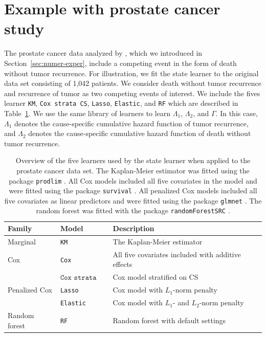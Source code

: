 \documentclass{statsoc}
\numberwithin{theorem}{section}
\newcommand{\1}{\mathds{1}}
\begin{document}
\section{Example with prostate cancer study}
\label{sec:real-data-appl}

The prostate cancer data analyzed by \cite{kattan2000pretreatment}, which we
introduced in Section~\ref{sec:numer-exper}, include a competing event in the
form of death without tumor recurrence. For illustration, we fit the state
learner to the original data set consisting of 1,042 patients. We consider death
without tumor recurrence and recurrence of tumor as two competing events of
interest. We include the fives learner \texttt{KM}, \texttt{Cox strata CS},
\texttt{Lasso}, \texttt{Elastic}, and \texttt{RF} which are described in
Table~\ref{tab:zel-library}. We use the same library of learners to learn
\( \Lambda_1 \), \( \Lambda_2 \), and $\Gamma$. In this case, \( \Lambda_1 \)
denotes the cause-specific cumulative hazard function of tumor recurrence, and
\( \Lambda_2 \) denotes the cause-specific cumulative hazard function of death
without tumor recurrence.

\begin{table}
  \caption{\label{tab:zel-library}Overview of the five learners used by the
  state learner when applied to the prostate cancer data set. The Kaplan-Meier
  estimator was fitted using the package \texttt{prodlim}
  \citep{Gerds_2019prodlim}. All Cox models included all five covariates in
  the model and were fitted using the package \texttt{survival}
  \citep{survival-package}. All penalized Cox models included all five
  covariates as linear predictors and were fitted using the package
  \texttt{glmnet} \citep{glmnet-cox,glmnet-glm}. The random forest was fitted
  with the package \texttt{randomForestSRC} \citep{rfsrc-paclage}.}
\centering
  \begin{tabular}{ lll }
    \toprule
    Family & Model & Description \\
    \midrule
    Marginal & \texttt{KM} & The Kaplan-Meier estimator \\ 
    Cox & \texttt{Cox} & All five covariates included with additive effects \\
           & \( \texttt{Cox strata CS} \)  & Cox model stratified on CS  \\
    Penalized Cox & \texttt{Lasso} & Cox model with \( L_1 \)-norm penalty   \\
           & \texttt{Elastic} & Cox model with \( L_1 \)- and \( L_2 \)-norm penalty \\
    Random forest & \texttt{RF} & Random forest with default settings \\
    \bottomrule 
  \end{tabular}
\end{table}
\end{document}
